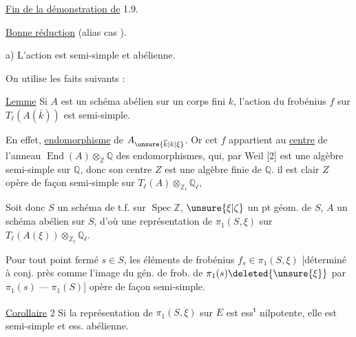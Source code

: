 \uline{Fin de la démonstration de} 1.9.

\uline{Bonne réduction}  (alias cas ).

a) L'action est semi-simple et abélienne.

On utilise les faits suivants :

\uline{Lemme} Si $A$ est un schéma abélien sur un corps fini $k$, l'action du frobénius  $f$ sur $T_\ell(A(\overline k))$ est semi-simple.

En effet,    \uline{endomorphisme} de $A_{\unsure{\overline k|k|\xi}}$.  Or cet $f$ appartient au \uline{centre} de l'anneau $\operatorname{End}(A)\otimes_{\mathbb{Z}}\mathbb{Q}$ des endomorphismes,  qui, par Weil [2] est une algèbre  semi-simple sur  $\mathbb{Q}$, donc son centre $Z$ est une  algèbre finie   de $\mathbb{Q}$.     il est clair $Z$ opère de façon semi-simple sur $T_\ell(A)\otimes_{\mathbb{Z}_\ell}\mathbb{Q}_\ell$,

  Soit donc $S$ un schéma  de t.f. sur $\operatorname{Spec}\mathbb{Z}$, $\unsure{\xi|\zeta}$ un pt géom. de $S$, $A$ un schéma abélien sur $S$,  d'où une représentation de $\pi_1(S,\xi)$ sur  $T_\ell(A(\xi))\otimes_{\mathbb{Z}_\ell}\mathbb{Q}_\ell$.

Pour tout point fermé $s\in S$, les éléments de frobénius $f_s\in\pi_1(S,\xi)$ [déterminé à  conj. près comme l'image du gén. de frob. de $\pi_1(s)\deleted{\unsure{\xi}}$ par $\pi_1(s)\mathrel{\text{---}}\pi_1(S)$] opère  de façon semi-simple.

\uline{Corollaire} 2 Si la représentation de $\pi_1(S,\xi)$ sur $E$ est  ess\textsuperscript{t} nilpotente, elle est  semi-simple et ess. abélienne.
